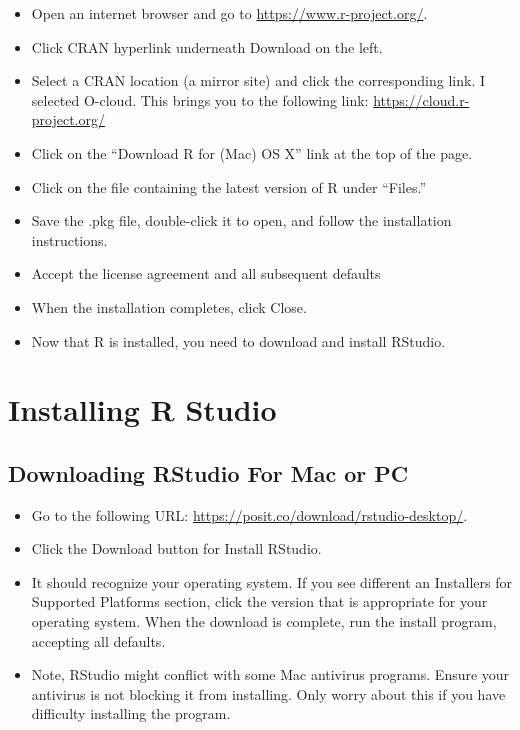 \documentclass[
  letterpaper,
  DIV=11,
  numbers=noendperiod]{scrreprt}
\providecommand{\tightlist}{%
  \setlength{\itemsep}{0pt}\setlength{\parskip}{0pt}}\usepackage{longtable,booktabs,array}
\begin{document}
\begin{itemize}
\tightlist
\item
  Open an internet browser and go to \url{https://www.r-project.org/}.
\item
  Click CRAN hyperlink underneath Download on the left.
\item
  Select a CRAN location (a mirror site) and click the corresponding
  link. I selected O-cloud. This brings you to the following link:
  \url{https://cloud.r-project.org/}
\item
  Click on the ``Download R for (Mac) OS X'' link at the top of the
  page.
\item
  Click on the file containing the latest version of R under ``Files.''
\item
  Save the .pkg file, double-click it to open, and follow the
  installation instructions.
\item
  Accept the license agreement and all subsequent defaults
\item
  When the installation completes, click Close.
\item
  Now that R is installed, you need to download and install RStudio.
\end{itemize}


\chapter{Installing R Studio}\label{installing-r-studio}

\section{Downloading RStudio For Mac or
PC}\label{downloading-rstudio-for-mac-or-pc}

\begin{itemize}
\tightlist
\item
  Go to the following URL:
  \url{https://posit.co/download/rstudio-desktop/}.
\item
  Click the Download button for Install RStudio.
\item
  It should recognize your operating system. If you see different an
  Installers for Supported Platforms section, click the version that is
  appropriate for your operating system. When the download is complete,
  run the install program, accepting all defaults.
\item
  Note, RStudio might conflict with some Mac antivirus programs. Ensure
  your antivirus is not blocking it from installing. Only worry about
  this if you have difficulty installing the program.
\end{itemize}
\end{document}
